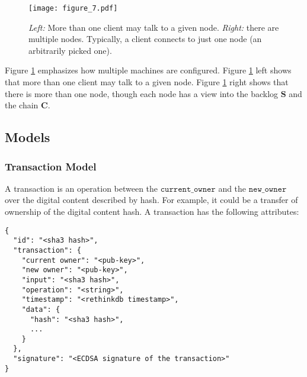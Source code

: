 \begin{figure}[!ht]
  \centering
  \texttt{[image: figure\_7.pdf]}
  \caption{\textit{Left:} More than one client may talk to a given node.
  \textit{Right:} there are multiple nodes. Typically, a client connects to just one node (an arbitrarily picked one).}
  \label{fig:bigchaindb_architecture_sharding}
\end{figure}

Figure \ref{fig:bigchaindb_architecture_sharding} emphasizes how multiple machines are configured.
Figure \ref{fig:bigchaindb_architecture_sharding} left shows that more than one client may talk to a given node.
Figure \ref{fig:bigchaindb_architecture_sharding} right shows that there is more than one node, though each node has a view into the backlog $\mathbf{S}$ and the chain $\mathbf{C}$.


\subsection{Models}\label{subsec:bigchaindb:models}
\subsubsection{Transaction Model}
A transaction is an operation between the $\mathtt{current\_owner}$ and the $\mathtt{new\_owner}$ over the digital content described by hash.
For example, it could be a transfer of ownership of the digital content hash.
A transaction has the following attributes:

\begin{lstlisting}[style=json]
{
  "id": "<sha3 hash>",
  "transaction": {
    "current owner": "<pub-key>",
    "new owner": "<pub-key>",
    "input": "<sha3 hash>",
    "operation": "<string>",
    "timestamp": "<rethinkdb timestamp>", 
    "data": {
      "hash": "<sha3 hash>",
      ...
    } 
  },
  "signature": "<ECDSA signature of the transaction>"
}
\end{lstlisting}

